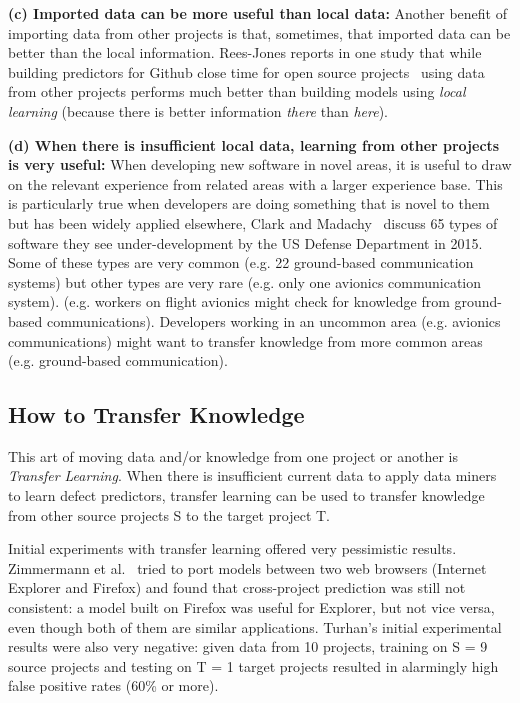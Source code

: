 \documentclass[10pt,journal,compsoc]{IEEEtran}
\begin{document}
\textbf{(c) Imported data can be more useful than local data:} Another benefit of  importing data from other projects is that, sometimes, that imported data can be better than the local information. Rees-Jones reports in one study that while building predictors
for Github close time  for open source projects~\cite{rees2017better} using data from other projects performs much better than building models using {\em local learning} (because there is better  information {\em there} than {\em here}).


\textbf{(d) When there is insufficient local data, learning from other projects is very useful:} When developing new software in  novel areas, it is useful to draw on the relevant  experience  from related areas with a larger experience base. This is particularly true when developers are doing something that is novel to them but has been widely applied elsewhere, Clark and Madachy~\cite{clark15} discuss 65 types of software they see        under-development by the US Defense Department in 2015.   Some of these types are very common (e.g. 22 ground-based communication systems) but other types are very rare (e.g. only  one avionics communication system). (e.g. workers on   flight avionics   might check for knowledge  from ground-based communications). Developers  working in an uncommon area (e.g. avionics communications) might want to transfer knowledge from more common areas (e.g. ground-based communication).

\subsection{ How to  Transfer Knowledge}\label{tion:how1}
This     art of moving data and/or knowledge  from one project or another is {\em Transfer Learning}. When there is insufficient current data to apply data miners to learn defect predictors, transfer learning can be used to transfer knowledge from other source projects S to the target project T.

Initial experiments with transfer learning offered very pessimistic results. Zimmermann et al.~\cite{zimmermann2009cross} tried to port models between two web browsers (Internet Explorer and Firefox) and found that cross-project prediction was still not consistent: a model built on Firefox was useful for Explorer, but not vice versa, even though both of them are similar applications. Turhan's initial experimental results were also very negative: given data from 10 projects, training on S = 9 source projects and testing on T = 1 target projects resulted in alarmingly high false positive rates (60\% or more). 
\end{document}
